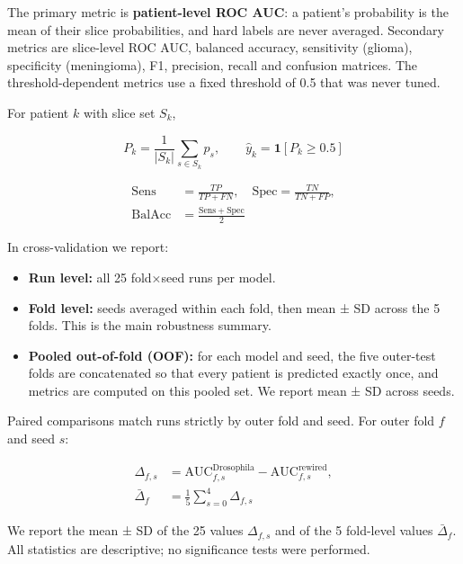 The primary metric is \textbf{patient-level ROC AUC}: a patient's probability is the mean of their slice probabilities, and hard labels are never averaged. Secondary metrics are slice-level ROC AUC, balanced accuracy, sensitivity (glioma), specificity (meningioma), F1, precision, recall and confusion matrices. The threshold-dependent metrics use a fixed threshold of 0.5 that was never tuned.

For patient $k$ with slice set $S_k$,

\begin{equation}
P_k = \frac{1}{|S_k|}\sum_{s\in S_k} p_s, \qquad \hat{y}_k = \mathbf{1}\left[P_k \geq 0.5\right]
\label{eq:8}
\end{equation}

\begin{equation}
\begin{aligned}
\mathrm{Sens} &= \frac{TP}{TP+FN}, \quad \mathrm{Spec} = \frac{TN}{TN+FP}, \\
\mathrm{BalAcc} &= \frac{\mathrm{Sens}+\mathrm{Spec}}{2}
\end{aligned}
\label{eq:9}
\end{equation}

In cross-validation we report:

\begin{itemize}
\item \textbf{Run level:} all 25 fold×seed runs per model.
\item \textbf{Fold level:} seeds averaged within each fold, then mean ± SD across the 5 folds. This is the main robustness summary.
\item \textbf{Pooled out-of-fold (OOF):} for each model and seed, the five outer-test folds are concatenated so that every patient is predicted exactly once, and metrics are computed on this pooled set. We report mean ± SD across seeds.
\end{itemize}

Paired comparisons match runs strictly by outer fold and seed. For outer fold $f$ and seed $s$:

\begin{equation}
\begin{aligned}
\Delta_{f,s} &= \mathrm{AUC}^{\mathrm{Drosophila}}_{f,s} - \mathrm{AUC}^{\mathrm{rewired}}_{f,s}, \\
\bar{\Delta}_f &= \frac{1}{5}\sum_{s=0}^{4}\Delta_{f,s}
\end{aligned}
\label{eq:10}
\end{equation}

We report the mean ± SD of the 25 values $\Delta_{f,s}$ and of the 5 fold-level values $\bar{\Delta}_f$. All statistics are descriptive; no significance tests were performed.
